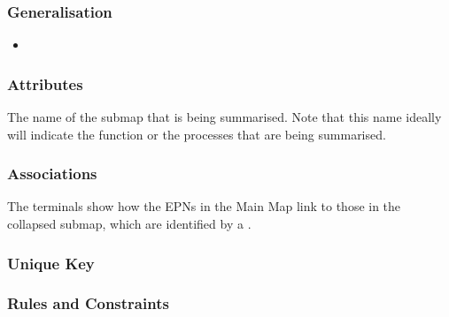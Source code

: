 \subsubsection{Generalisation}

\begin{itemize}
\item {}
\end{itemize}

\subsubsection{Attributes}

\begin{attributes}
   The name of the submap that is being
  summarised. Note that this name ideally will indicate the function
  or the processes that are being summarised.
\end{attributes}

\subsubsection{Associations}

\begin{attributes}
 The terminals show how the
EPNs in the Main Map link to those in the collapsed submap,
which are identified by a .
\end{attributes}

\subsubsection{Unique Key}

\begin{logicalkey}
  \item {}
  \item {}
\end{logicalkey}

\subsubsection{Rules and Constraints}

\begin{valrules}
\end{valrules}

